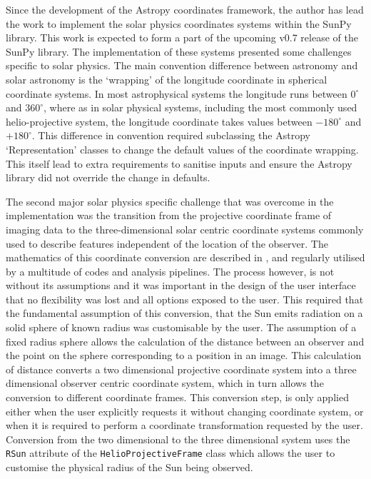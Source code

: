 Since the development of the Astropy coordinates framework, the author has lead the work to implement the solar physics coordinates systems within the SunPy library.
This work is expected to form a part of the upcoming v0.7 release of the SunPy library.
The implementation of these systems presented some challenges specific to solar physics.
The main convention difference between astronomy and solar astronomy is the `wrapping' of the longitude coordinate in spherical coordinate systems.
In most astrophysical systems the longitude runs between $0^\circ$ and $360^\circ$, where as in solar physical systems, including the most commonly used helio-projective system, the longitude coordinate takes values between $-180^\circ$ and $+180^\circ$.
This difference in convention required subclassing the Astropy `Representation' classes to change the default values of the coordinate wrapping.
This itself lead to extra requirements to sanitise inputs and ensure the Astropy library did not override the change in defaults.

The second major solar physics specific challenge that was overcome in the implementation was the transition from the projective coordinate frame of imaging data to the three-dimensional solar centric coordinate systems commonly used to describe features independent of the location of the observer.
The mathematics of this coordinate conversion are described in \cite{thompson2006}, and regularly utilised by a multitude of codes and analysis pipelines.
The process however, is not without its assumptions and it was important in the design of the user interface that no flexibility was lost and all options exposed to the user.
This required that the fundamental assumption of this conversion, that the Sun emits radiation on a solid sphere of known radius was customisable by the user.
The assumption of a fixed radius sphere allows the calculation of the distance between an observer and the point on the sphere corresponding to a position in an image.
This calculation of distance converts a two dimensional projective coordinate system into a three dimensional observer centric coordinate system, which in turn allows the conversion to different coordinate frames.
This conversion step, is only applied either when the user explicitly requests it without changing coordinate system, or when it is required to perform a coordinate transformation requested by the user.
Conversion from the two dimensional to the three dimensional system uses the \verb|RSun| attribute of the \verb|HelioProjectiveFrame| class which allows the user to customise the physical radius of the Sun being observed.

